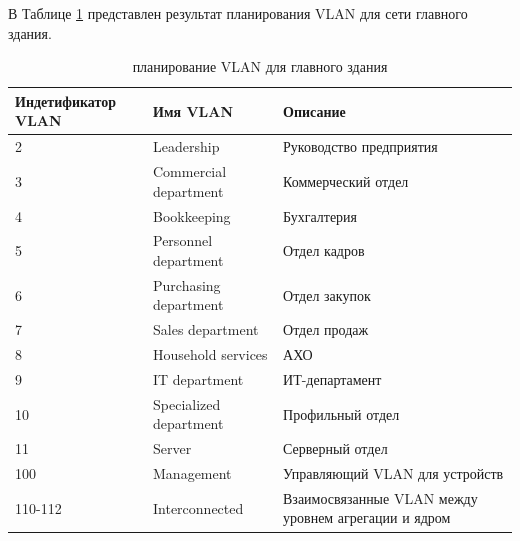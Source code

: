 \documentclass[14pt, a4paper]{extarticle}
\numberwithin{equation}{section}
\begin{document}
В Таблице \ref{table:mainDepVlan} представлен результат планирования VLAN для сети главного здания.
\begin{table}[H]
\centering
\small
\label{table:mainDepVlan}
\caption{планирование VLAN для главного здания}
\begin{tabular}{|l|l|m{6cm}|}
\hline
\textbf{Индетификатор VLAN} & \textbf{Имя VLAN} & \textbf{Описание} \\
\hline
2 & Leadership & Руководство предприятия \\
\hline
3 & Commercial department & Коммерческий отдел \\
\hline
4 & Bookkeeping & Бухгалтерия \\
\hline
5 & Personnel department & Отдел кадров \\
\hline 
6 & Purchasing department & Отдел закупок \\
\hline 
7 & Sales department & Отдел продаж \\
\hline 
8 & Household services & АХО \\
\hline 
9 & IT department & ИТ-департамент \\
\hline
10 & Specialized department & Профильный отдел \\
\hline
11 & Server & Серверный отдел \\
\hline
100 & Management & Управляющий VLAN для устройств \\
\hline
110-112 & Interconnected & Взаимосвязанные VLAN между уровнем агрегации и ядром \\
\hline
\end{tabular}
\end{table}
\end{document}

